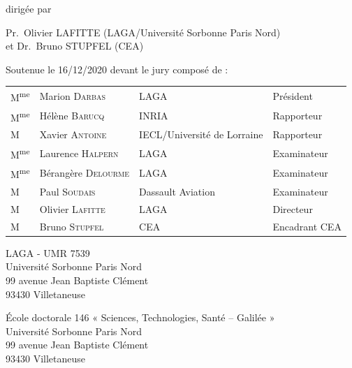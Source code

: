 \begin{titlepage}
\begin{center}
{
    \large dirigée par}

{
    \Large
    Pr.~Olivier LAFITTE (LAGA/Université Sorbonne Paris Nord)\\
    et Dr.~Bruno STUPFEL (CEA)
}



{
    \large Soutenue le 16/12/2020 devant le jury composé de :
}
\newcommand{\mme}{M\textsuperscript{me}}

{
    \large
    \begin{tabular}{llll}
    \mme& Marion \textsc{Darbas} & LAGA & Président
    \\
    \mme& Hélène \textsc{Barucq} & INRIA & Rapporteur
    \\
    M& Xavier \textsc{Antoine} & IECL/Université de Lorraine & Rapporteur
    \\
    \mme& Laurence \textsc{Halpern} & LAGA & Examinateur
    \\
    \mme& Bérangère \textsc{Delourme} & LAGA & Examinateur
    \\
    M& Paul \textsc{Soudais} & Dassault Aviation & Examinateur
    \\
    M& Olivier \textsc{Lafitte} & LAGA & Directeur
    \\
    M& Bruno \textsc{Stupfel} & CEA & Encadrant CEA
    \\
    \end{tabular}
}

\end{center}

\newpage
\thispagestyle{empty}
\vspace*{\fill}

\noindent
\begin{center}
\begin{minipage}[t]{0.5\textwidth}
LAGA - UMR 7539\\
Université Sorbonne Paris Nord\\
99 avenue Jean Baptiste Clément\\
93430 Villetaneuse
\end{minipage}%
%
\hfill%
%
\begin{minipage}[t]{0.5\textwidth}
École doctorale 146 « Sciences, Technologies, Santé – Galilée »\\
Université Sorbonne Paris Nord\\
99 avenue Jean Baptiste Clément\\
93430 Villetaneuse
\end{minipage}
\end{center}



\end{titlepage}
\hypersetup{pageanchor=true}
\cleardoublepage
